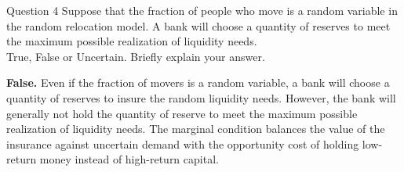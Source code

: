 \documentclass[a4paper]{article}
\newif\IfInSansMode
\numberwithin{equation}{section}
\numberwithin{figure}{section}
\begin{document}
	\begin{questionbox}{Question 4}
		Suppose that the fraction of people who move is a random variable in the random relocation model. A bank will choose a quantity of reserves to meet the maximum possible realization of liquidity needs.\\
		True, False or Uncertain. Briefly explain your answer.
		\begin{explanationbox}
			\textbf{False.} Even if the fraction of movers is a random variable, a bank will choose a quantity of reserves to insure the random liquidity needs. However, the bank will generally not hold the quantity of reserve to meet the maximum possible realization of liquidity needs. The marginal condition balances the value of the insurance against uncertain demand with the opportunity cost of holding low-return money instead of high-return capital.
		\end{explanationbox}
	\end{questionbox}
\end{document}
